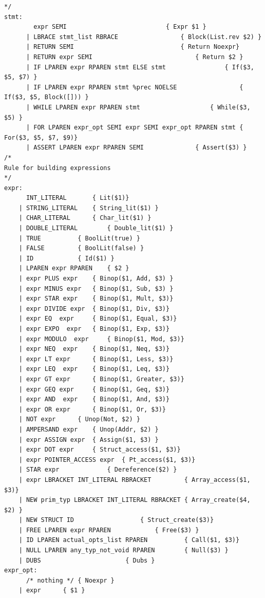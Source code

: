 \documentclass{article}
\begin{document}
\begin{lstlisting}
*/
stmt:
	    expr SEMI 						    { Expr $1 }
	  | LBRACE stmt_list RBRACE				    { Block(List.rev $2) }
	  | RETURN SEMI					            { Return Noexpr}
	  | RETURN expr SEMI				            { Return $2 }
	  | IF LPAREN expr RPAREN stmt ELSE stmt 	            { If($3, $5, $7) }
	  | IF LPAREN expr RPAREN stmt %prec NOELSE 	       	    { If($3, $5, Block([])) }
	  | WHILE LPAREN expr RPAREN stmt 		       	    { While($3, $5) }
  	  | FOR LPAREN expr_opt SEMI expr SEMI expr_opt RPAREN stmt { For($3, $5, $7, $9)}
	  | ASSERT LPAREN expr RPAREN SEMI 			    { Assert($3) }
/* 
Rule for building expressions 
*/
expr:
	  INT_LITERAL 		{ Lit($1)}
	| STRING_LITERAL	{ String_lit($1) }  
	| CHAR_LITERAL 		{ Char_lit($1) }
	| DOUBLE_LITERAL        { Double_lit($1) }
	| TRUE			{ BoolLit(true) }
	| FALSE			{ BoolLit(false) }
	| ID 			{ Id($1) }
	| LPAREN expr RPAREN 	{ $2 }
	| expr PLUS expr 	{ Binop($1, Add, $3) }
	| expr MINUS expr 	{ Binop($1, Sub, $3) }
	| expr STAR expr 	{ Binop($1, Mult, $3)}
	| expr DIVIDE expr 	{ Binop($1, Div, $3)}
	| expr EQ  expr 	{ Binop($1, Equal, $3)}
	| expr EXPO  expr 	{ Binop($1, Exp, $3)}
	| expr MODULO  expr 	{ Binop($1, Mod, $3)}
	| expr NEQ  expr 	{ Binop($1, Neq, $3)}
	| expr LT expr 		{ Binop($1, Less, $3)}
	| expr LEQ  expr 	{ Binop($1, Leq, $3)}
	| expr GT expr 		{ Binop($1, Greater, $3)}
	| expr GEQ expr 	{ Binop($1, Geq, $3)}
	| expr AND  expr 	{ Binop($1, And, $3)}
	| expr OR expr 		{ Binop($1, Or, $3)}
	| NOT expr		{ Unop(Not, $2) }
	| AMPERSAND expr	{ Unop(Addr, $2) }
	| expr ASSIGN expr 	{ Assign($1, $3) }
	| expr DOT expr 	{ Struct_access($1, $3)}
	| expr POINTER_ACCESS expr 	{ Pt_access($1, $3)}
	| STAR expr 			{ Dereference($2) }
	| expr LBRACKET INT_LITERAL RBRACKET 	     { Array_access($1, $3)}
	| NEW prim_typ LBRACKET INT_LITERAL RBRACKET { Array_create($4, $2) }
	| NEW STRUCT ID 			     { Struct_create($3)}
	| FREE LPAREN expr RPAREN		     { Free($3) }
	| ID LPAREN actual_opts_list RPAREN          { Call($1, $3)}
	| NULL LPAREN any_typ_not_void RPAREN 	     { Null($3) }
 	| DUBS					     { Dubs }
expr_opt:
	  /* nothing */ { Noexpr }
	| expr 		{ $1 }
\end{lstlisting}
\newpage
\end{document}
